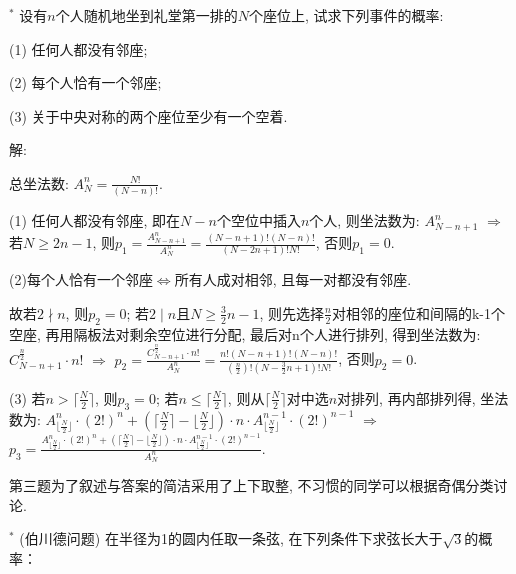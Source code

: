 \documentclass[standard]{ExBook}
\renewenvironment{shaded}{%
  \def\FrameCommand{\fboxsep=\FrameSep \colorbox{shadecolor}}%
  \MakeFramed{\advance\hsize-\width \FrameRestore}%
}{%
  \endMakeFramed
}
\begin{document}
\begin{qitems}
    \begin{bbox}
    \begin{shaded}
        \qitem$^*$
设有$n$个人随机地坐到礼堂第一排的$N$个座位上, 试求下列事件的概率:

(1) 任何人都没有邻座;

(2) 每个人恰有一个邻座;

(3) 关于中央对称的两个座位至少有一个空着.
    \end{shaded}
    \end{bbox}

\vspace{\dimexpr2.5cm-5em\relax}

解:

总坐法数: $A_{N}^{n}=\frac{N!}{(N-n)!}$.

(1) 任何人都没有邻座, 即在$N-n$个空位中插入$n$个人, 则坐法数为: $A_{N-n+1}^{n}$ $\Longrightarrow$ 若$N \geq 2n-1$, 则$p_{1}=\frac{A_{N-n+1}^{n}}{A_{N}^{n}}=\frac{(N-n+1)!(N-n)!}{(N-2n+1)!N!}$, 否则$p_{1}=0$.

(2)每个人恰有一个邻座$\Longleftrightarrow$所有人成对相邻, 且每一对都没有邻座.

故若$2 \nmid n$, 则$p_{2}=0$; 若$2 \mid n$且$N\geq \frac{3}{2}n-1$, 则先选择$\frac{n}{2}$对相邻的座位和间隔的k-1个空座, 再用隔板法对剩余空位进行分配, 最后对n个人进行排列, 得到坐法数为: $C_{N-n+1}^{\frac{n}{2}}\cdot n!$ $\Longrightarrow$ $p_{2}=\frac{C_{N-n+1}^{\frac{n}{2}}\cdot n!}{A_{N}^{n}}=\frac{n!(N-n+1)!(N-n)!}{(\frac{n}{2})!(N-\frac{3}{2}n+1)!N!}$, 否则$p_{2}=0$.

(3) 若$n>\lceil\frac{N}{2}\rceil$, 则$p_{3}=0$; 若$n \leq \lceil\frac{N}{2}\rceil$, 则从$\lceil\frac{N}{2}\rceil$对中选$n$对排列, 再内部排列得, 坐法数为: $A_{\lfloor\frac{N}{2}\rfloor}^{n}\cdot(2!)^{n}+(\lceil\frac{N}{2}\rceil-\lfloor\frac{N}{2}\rfloor)\cdot n\cdot A_{\lfloor\frac{N}{2}\rfloor}^{n-1}\cdot(2!)^{n-1}$ $\Longrightarrow$ $p_{3}=\frac{A_{\lfloor\frac{N}{2}\rfloor}^{n}\cdot(2!)^{n}+(\lceil\frac{N}{2}\rceil-\lfloor\frac{N}{2}\rfloor)\cdot n\cdot A_{\lfloor\frac{N}{2}\rfloor}^{n-1}\cdot(2!)^{n-1}}{A_{N}^{n}}$.

\textcolor{themeColor}{\selectfont {} 第三题为了叙述与答案的简洁采用了上下取整, 不习惯的同学可以根据奇偶分类讨论.}

\vspace{2.5cm-5em}

    \begin{bbox}
    \begin{shaded}
        \qitem$^*$
(伯川德问题) 在半径为1的圆内任取一条弦, 在下列条件下求弦长大于$\sqrt{3}$的概率：


\end{shaded}
\end{bbox}
\end{qitems}
\end{document}

